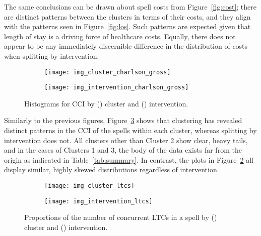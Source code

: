 \documentclass[11pt]{article}
\newlength{\imgwidth}
\begin{document}
The same conclusions can be drawn about spell costs from Figure~\ref{fig:cost};
there are distinct patterns between the clusters in terms of their costs, and
they align with the patterns seen in Figure~\ref{fig:los}. Such patterns are
expected given that length of stay is a driving force of healthcare costs.
Equally, there does not appear to be any immediately discernible difference in
the distribution of costs when splitting by intervention.

\begin{figure}
    \centering
    \begin{subfigure}{.5\imgwidth}
        \texttt{[image: img\_cluster\_charlson\_gross]}
        \caption{}\label{fig:cluster_charlson}
    \end{subfigure}\hfill%
    \begin{subfigure}{.5\imgwidth}
        \texttt{[image: img\_intervention\_charlson\_gross]}
        \caption{}\label{fig:intervention_charlson}
    \end{subfigure}
    \caption{%
        Histograms for CCI by () cluster and
        () intervention.
    }\label{fig:charlson}
\end{figure}

Similarly to the previous figures, Figure~\ref{fig:charlson} shows that
clustering has revealed distinct patterns in the CCI of the spells within each
cluster, whereas splitting by intervention does not. All clusters other than
Cluster 2 show clear, heavy tails, and in the cases of Clusters 1 and 3, the
body of the data exists far from the origin as indicated in
Table~\ref{tab:summary}. In contrast, the plots in
Figure~\ref{fig:intervention_charlson} all display similar, highly skewed
distributions regardless of intervention.

\begin{figure}
    \centering
    \begin{subfigure}{.5\imgwidth}
        \texttt{[image: img\_cluster\_ltcs]}
        \caption{}\label{fig:cluster_ltcs}
    \end{subfigure}\hfill%
    \begin{subfigure}{.5\imgwidth}
        \texttt{[image: img\_intervention\_ltcs]}
        \caption{}\label{fig:intervention_ltcs}
    \end{subfigure}
    \caption{%
        Proportions of the number of concurrent LTCs in a spell by
        () cluster and ()
        intervention.
    }\label{fig:ltcs}
\end{figure}
\end{document}
